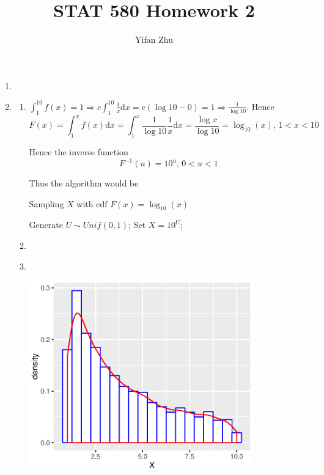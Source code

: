 \documentclass{article}
\begin{document}
	

	
	\title{STAT 580 Homework 2}
	\author{Yifan Zhu}
	\maketitle
	
	\begin{enumerate}[leftmargin = 0 em, label = \arabic*., font = \bfseries]
	\item 
	

	
	\item 
	\begin{enumerate}
		\item 
		$\int_{1}^{10} f(x) = 1 \Rightarrow c \int_{1}^{10} \frac{1}{x} \mathrm{d}x= c (\log 10 - 0) = 1 \Rightarrow \frac{1}{\log 10}$. Hence
		\[F(x) = \int_{1}^x f(x) \mathrm{d}x = \int_{1}^x \frac{1}{\log 10} \frac{1}{x} \mathrm{d}x = \frac{\log x}{\log 10} = \log_{10} (x) ,\, 1 < x < 10\]

		Hence the inverse function
		\[F^{-1}(u) = 10^u,\, 0<u<1\]

		Thus the algorithm would be
		\begin{algorithm}
			\caption{Sampling $X$ with cdf $F(x) = \log_{10}(x)$}
			\begin{algorithmic}[1]
				\State Generate $U \sim Unif(0,1)$;
				\State Set $X = 10^U$;
			\end{algorithmic}
		\end{algorithm}

		\item 

		\ 

		

		\item 

		\ 
		
		
		\includegraphics[width = 0.8\textwidth]{p2density.eps}


\end{enumerate}
\end{enumerate}
\end{document}
